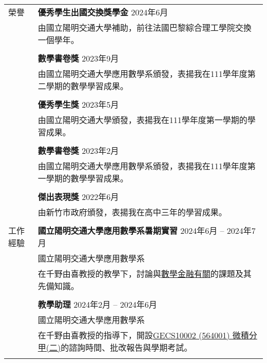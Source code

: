 \documentclass[letterpaper, 11pt]{article}
\begin{document}
\begin{CJK*}{UTF8}{bsmi}
\begin{center}
\begin{longtable}{p{0.72in}p{5.97in}}
        
        {\textcolor{OliveGreen}{榮譽}} & \textbf{優秀學生出國交換獎學金} \hfill 2024年6月\\
        & 由國立陽明交通大學補助，前往法國巴黎綜合理工學院交換一個學年。 \\
        & \\
        & \textbf{數學書卷獎} \hfill 2023年9月\\
        & 由國立陽明交通大學應用數學系頒發，表揚我在111學年度第二學期的數學學習成果。\\
        & \\
        & \textbf{優秀學生獎} \hfill 2023年5月\\
        & 由國立陽明交通大學頒發，表揚我在111學年度第一學期的學習成果。\\
        & \\
        & \textbf{數學書卷獎} \hfill 2023年2月\\
        & 由國立陽明交通大學應用數學系頒發，表揚我在111學年度第一學期的數學學習成果。\\
        & \\
        & \textbf{傑出表現獎} \hfill 2022年6月\\
        & 由新竹市政府頒發，表揚我在高中三年的學習成果。\\
        & \\
        
        
        {\textcolor{OliveGreen}{工作經驗}} & \textbf{國立陽明交通大學應用數學系暑期實習} \hfill 2024年6月 -- 2024年7月 \\
        & 國立陽明交通大學應用數學系 \\
        & 在千野由喜教授的教學下，討論與\href{https://hackmd.io/@eiken-sc11/B1QcaW3B0}{數學金融有關}的課題及其先備知識。\\
        & \\
        
        & \textbf{教學助理}  \hfill 2024年2月 -- 2024年6月 \\
        & 國立陽明交通大學應用數學系\\
        & 在千野由喜教授的指導下，開設\href{https://timetable.nycu.edu.tw/?r=main/crsoutline&Acy=112&Sem=2&CrsNo=564001&lang=zh-tw}{GECS10002 (564001) 微積分甲(二)}的諮詢時間、批改報告與學期考試。\\
        & \\
        

\end{longtable}
\end{center}
\end{CJK*}
\end{document}
